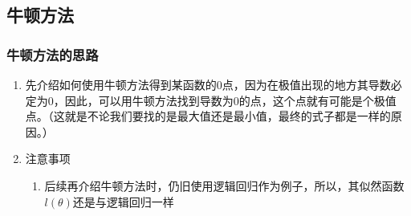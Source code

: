 \subsection{牛顿方法}

\subsubsection{牛顿方法的思路}
\begin{enumerate}
	\item 先介绍如何使用牛顿方法得到某函数的0点，因为在极值出现的地方其导数必定为0，因此，可以用牛顿方法找到导数为0的点，这个点就有可能是个极值点。（这就是不论我们要找的是最大值还是最小值，最终的式子都是一样的原因。）
	\item 注意事项
	\begin{enumerate}
		\item 后续再介绍牛顿方法时，仍旧使用逻辑回归作为例子，所以，其似然函数$l(\theta)$还是与逻辑回归一样
	\end{enumerate}
\end{enumerate}

